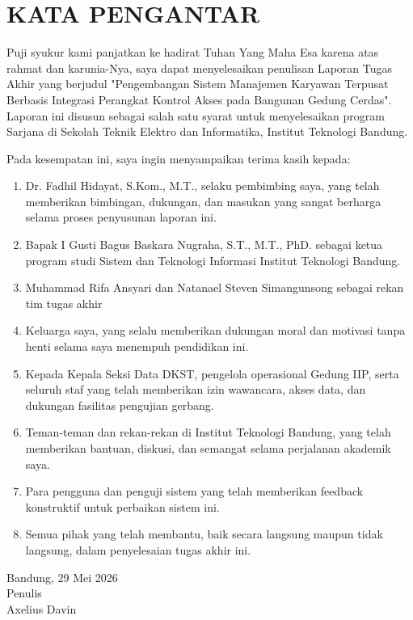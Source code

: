 \chapter*{KATA PENGANTAR}

Puji syukur kami panjatkan ke hadirat Tuhan Yang Maha Esa karena atas rahmat dan karunia-Nya, saya dapat menyelesaikan penulisan Laporan Tugas Akhir yang berjudul "Pengembangan Sistem Manajemen Karyawan Terpusat Berbasis Integrasi Perangkat Kontrol Akses pada Bangunan Gedung Cerdas". Laporan ini disusun sebagai salah satu syarat untuk menyelesaikan program Sarjana di Sekolah Teknik Elektro dan Informatika, Institut Teknologi Bandung.

Pada kesempatan ini, saya ingin menyampaikan terima kasih kepada: 
\begin{enumerate}
    \item Dr. Fadhil Hidayat, S.Kom., M.T., selaku pembimbing saya, yang telah memberikan bimbingan, dukungan, dan masukan yang sangat berharga selama proses penyusunan laporan ini.
    \item Bapak I Gusti Bagus Baskara Nugraha, S.T., M.T., PhD. sebagai ketua program studi Sistem dan Teknologi Informasi Institut Teknologi Bandung.
    \item Muhammad Rifa Ansyari dan Natanael Steven Simangunsong sebagai rekan tim tugas akhir
    \item Keluarga saya, yang selalu memberikan dukungan moral dan motivasi tanpa henti selama saya menempuh pendidikan ini.
    \item Kepada Kepala Seksi Data DKST, pengelola operasional Gedung IIP, serta seluruh staf yang telah memberikan izin wawancara, akses data, dan dukungan fasilitas pengujian gerbang.
    \item Teman-teman dan rekan-rekan di Institut Teknologi Bandung, yang telah memberikan bantuan, diskusi, dan semangat selama perjalanan akademik saya.
    \item Para pengguna dan penguji sistem yang telah memberikan feedback konstruktif untuk perbaikan sistem ini.
    \item Semua pihak yang telah membantu, baik secara langsung maupun tidak langsung, dalam penyelesaian tugas akhir ini.
\end{enumerate}
\begin{flushright}
    Bandung, 29 Mei 2026\\
    
    Penulis \\
    \vspace{1cm}
    Axelius Davin
\end{flushright}
